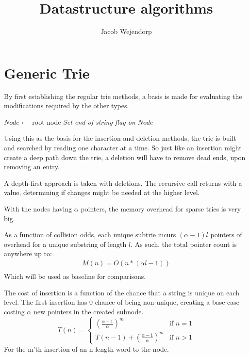 \documentclass[11pt,a4paper]{article}
\title{Datastructure algorithms}
\author{Jacob Wejendorp}
\begin{document}
\maketitle

\section{Generic Trie}
By first establishing the regular trie methods, a basis is made for evaluating
the modifications required by the other types.

\begin{algorithm}[H]
    \caption{$k$\FuncSty{)}}
    $Node \leftarrow$  root node\;
    \emph{Set end of string flag on $Node$}\;
\end{algorithm}
Using this as the basis for the insertion and deletion methods, the trie is
built and searched by reading one character at a time. So just like an
insertion might create a deep path down the trie, a deletion will have to
remove dead ends, upon removing an entry.

A depth-first approach is taken with deletions. The recursive call returns with
a value, determining if changes might be needed at the higher level.

With the nodes having $\alpha$ pointers, the memory overhead for sparse tries
is very big.

As a function of collision odds, each unique subtrie incurs $(\alpha-1) l$
pointers of overhead for a unique substring of length $l$. As such, the total
pointer count is anywhere up to:
\begin{align*}
    M(n) = O(n * (\alpha l - 1))\\
\end{align*}
Which will be used as baseline for comparisons.

The cost of insertion is a function of the chance that a string is unique on
each level. The first insertion has 0 chance of being non-unique, creating a
base-case costing $\alpha$ new pointers in the created subnode.
\[
    T(n) = \left\{ \begin{array}{ll}
                    (\frac{\alpha - 1}{\alpha})^m           & \text{if } n = 1 \\
                    T(n-1) + (\frac{\alpha - 1}{\alpha})^m   & \text{if } n > 1
                   \end{array}
                \right.
\]
For the m'th insertion of an n-length word to the node.
\end{document}
